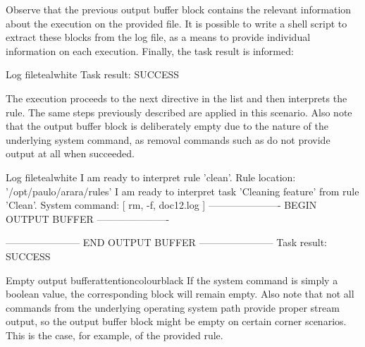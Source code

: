 
Observe that the previous output buffer block contains the relevant information about the  execution on the provided file. It is possible to write a shell script to extract these blocks from the log file, as a means to provide individual information on each execution. Finally, the task result is informed:

\begin{codebox}{Log file}{teal}{\icnote}{white}
Task result: SUCCESS
\end{codebox}

The execution proceeds to the next directive in the list and then interprets the  rule. The same steps previously described are applied in this scenario. Also note that the output buffer block is deliberately empty due to the nature of the underlying system command, as removal commands such as  do not provide output at all when succeeded.

\begin{codebox}{Log file}{teal}{\icnote}{white}
I am ready to interpret rule 'clean'.
Rule location: '/opt/paulo/arara/rules'
I am ready to interpret task 'Cleaning feature' from rule 'Clean'.
System command: [ rm, -f, doc12.log ]
---------------------- BEGIN OUTPUT BUFFER ----------------------

----------------------- END OUTPUT BUFFER -----------------------
Task result: SUCCESS
\end{codebox}

\begin{messagebox}{Empty output buffer}{attentioncolour}{\icattention}{black}
If the system command is simply a boolean value, the corresponding block will remain empty. Also note that not all commands from the underlying operating system path provide proper stream output, so the output buffer block might be empty on certain corner scenarios. This is the case, for example, of the provided  rule.
\end{messagebox}

